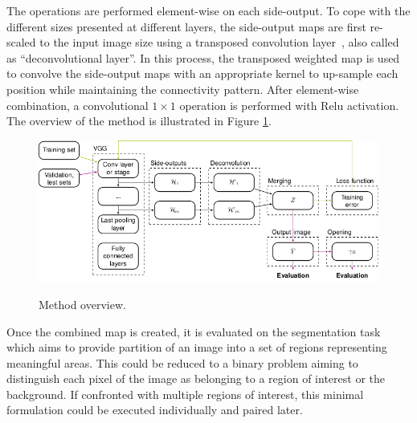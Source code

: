 The operations are performed element-wise on each side-output. To cope with the different sizes presented at different layers, the side-output maps are first re-scaled to the input image size using a transposed convolution layer~\cite{dumoulin2016}, also called as ``deconvolutional layer''. In this process, the transposed weighted map is used to convolve the side-output maps with an appropriate kernel to up-sample each position while maintaining the connectivity pattern. After element-wise combination, a convolutional $1\times1$ operation is performed with Relu activation. The overview of the method is illustrated in Figure \ref{fig:side_outputs_method}.

\begin{figure}[ht]
  \caption{Method overview.}
  \centering
  \includegraphics[width=1.\columnwidth]{figures/falreis/side_outputs_method.png}
  \label{fig:side_outputs_method}
\end{figure}


Once the combined map is created, it is evaluated on the segmentation task which aims to provide partition of an image into a set of regions representing meaningful areas. This could be reduced to a binary problem aiming to distinguish each pixel of the image as belonging to a region of interest or the background. If confronted with multiple regions of interest, this minimal formulation could be executed individually and paired later. %

